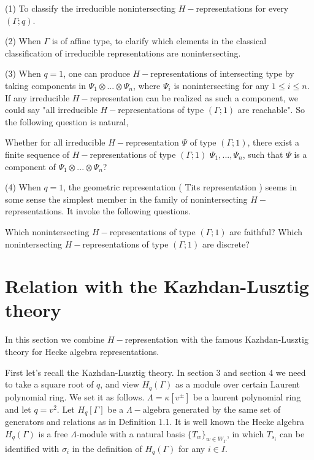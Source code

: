 \def\CTEXPreproc{Created by ctex v0.2.12, don't edit!}\documentclass[11pt]{article}
\begin{document}
\noindent(1) To classify the irreducible nonintersecting  $H-$representations for every $(\Gamma;q)$.

\noindent(2) When $\Gamma$ is of affine type, to clarify which elements in the classical classification of irreducible representations are nonintersecting.

\noindent(3) When $q=1$, one can produce $H-$representations of intersecting type by taking components in $\Psi_1 \otimes ...\otimes \Psi_n  $, where $\Psi_i$ is nonintersecting for any $1\leq i\leq n$. If any irreducible $H-$representation can be realized as such a component, we could say "all irreducible $H-$representations of type $(\Gamma;1)$ are reachable". So the following question is natural,

Whether for all irreducible $H-$representation $\Psi$ of type $(\Gamma;1)$, there exist a finite sequence of $H-$representations of
type $(\Gamma;1)$ $\Psi_1 ,..., \Psi_n$, such that $\Psi$ is a component of $ \Psi_1 \otimes ...\otimes \Psi_n $?

\noindent(4) When $q=1$, the geometric representation ( Tits representation  ) seems in some sense the simplest member in the family of nonintersecting $H-$representations. It invoke the following questions.

Which nonintersecting $H-$representations of type $(\Gamma ;1)$ are faithful?
Which nonintersecting $H-$representations of type $(\Gamma ;1)$ are discrete?





















 \section{Relation with the Kazhdan-Lusztig theory}
  In this section we combine $H-$representation with the famous  Kazhdan-Lusztig theory for Hecke algebra representations.

  First let's recall the Kazhdan-Lusztig theory. In section 3 and section 4 we need to take a square root of $q$, and view $H_q (\Gamma)$ as a module over certain Laurent polynomial ring. We set it as follows. $\Lambda= \kappa[ v^{\pm} ]$ be a laurent polynomial ring and let $q=v^2$. Let $H_q [\Gamma]$ be a $\Lambda-$algebra generated by the same set of generators and relations as in Definition 1.1. It is well known the Hecke algebra $H_{q}(\Gamma) $ is a free $\Lambda$-module with a natural basis $\{  T_{w} \}_{w\in W_{\Gamma}}$, in which $T_{s_i }$ can be identified with $ \sigma_i $ in the definition of $H_q (\Gamma)$ for any $i\in I$.
\end{document}
